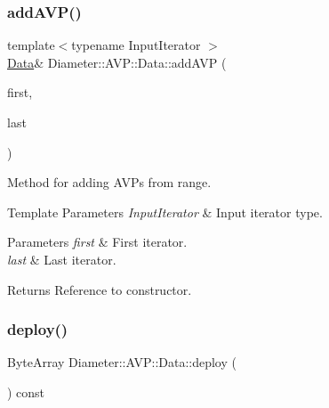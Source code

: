 \subsubsection{\texorpdfstring{add\+A\+V\+P()}{addAVP()}\hspace{0.1cm}{\footnotesize\ttfamily [2/2]}}
{\footnotesize\ttfamily template$<$typename Input\+Iterator $>$ \\
\hyperlink{classDiameter_1_1AVP_1_1Data}{Data}\& Diameter\+::\+A\+V\+P\+::\+Data\+::add\+A\+VP (\begin{DoxyParamCaption}\item[{Input\+Iterator}]{first,  }\item[{Input\+Iterator}]{last }\end{DoxyParamCaption})\hspace{0.3cm}{\ttfamily [inline]}}



Method for adding A\+V\+Ps from range. 


\begin{DoxyTemplParams}{Template Parameters}
{\em Input\+Iterator} & Input iterator type. \\
\hline
\end{DoxyTemplParams}

\begin{DoxyParams}{Parameters}
{\em first} & First iterator. \\
\hline
{\em last} & Last iterator. \\
\hline
\end{DoxyParams}
\begin{DoxyReturn}{Returns}
Reference to constructor. 
\end{DoxyReturn}
\mbox{\label{classDiameter_1_1AVP_1_1Data_a71951bfda9c3be98f5c7c0e6fa5382cf}} 
\subsubsection{\texorpdfstring{deploy()}{deploy()}\hspace{0.1cm}{\footnotesize\ttfamily [1/2]}}
{\footnotesize\ttfamily Byte\+Array Diameter\+::\+A\+V\+P\+::\+Data\+::deploy (\begin{DoxyParamCaption}{ }\end{DoxyParamCaption}) const}



